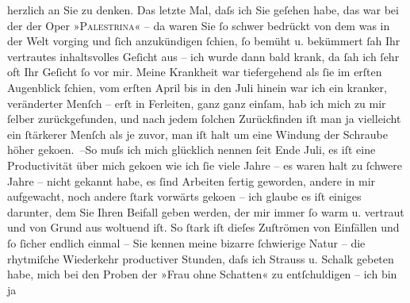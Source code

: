 \begin{ledgroupsized}[t]{13cm}
               herzlich an Sie zu denken.\pend
           \pstart
           Das letzte Mal, daſs ich Sie geſehen habe, das war bei der \label{K_L02326_1v}\label{K_L02326_1h} der Oper »\textsc{Palestrina}« – da waren Sie ſo schwer bedrückt von dem was in der Welt vorging und ſich
               anzukündigen ſchien, ſo bemüht u. bekümmert ſah Ihr vertrautes inhaltsvolles Geſicht
               aus – ich wurde dann bald krank, da ſah ich ſehr oft Ihr Geſicht ſo vor mir. Meine
               Krankheit war tiefergehend als ſie im erſten Augenblick ſchien, vom erſten
                  April bis in den Juli hinein war ich ein kranker, veränderter
               Menſch – erſt in Ferleiten, ganz ganz einſam,
               hab ich mich zu mir ſelber {\pb}zurückgefunden, und nach jedem ſolchen Zurückfinden iſt man ja vielleicht ein
               ſtärkerer Menſch als je zuvor, man iſt halt um eine Windung der Schraube höher geko{\geminationm}en. –\hspace*{1.5em}So muſs ich mich
               glücklich nennen ſeit Ende Juli, es iſt eine Productivität über mich
                  geko{\geminationm}en wie ich ſie viele Jahre – es waren halt zu
               ſchwere Jahre – nicht gekannt habe, es ſind Arbeiten fertig geworden, andere in mir
               aufgewacht, noch andere ſtark vorwärts geko{\geminationm}en – ich
               glaube es iſt einiges darunter, dem Sie Ihren Beifall geben werden, der mir immer ſo
               warm u. vertraut und von Grund aus woltuend iſt.\pend
           \pstart
           So ſtark iſt dieſes Zuſtrömen von Einfällen und ſo ſicher endlich einmal – Sie kennen
               meine bizarre ſchwierige Natur – die rhytmiſche Wiederkehr productiver Stunden, daſs
               ich Strauss u. Schalk gebeten habe, mich bei den Proben der »Frau ohne Schatten« zu entſchuldigen – ich bin ja

\end{ledgroupsized}
